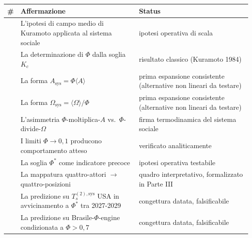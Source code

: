 {\def\LTcaptype{none} %
{\small\begin{longtable}[]{@{}
  >{\raggedright\arraybackslash}p{}
  >{\raggedright\arraybackslash}p{}
  >{\raggedright\arraybackslash}p{}@{}}
\toprule\noalign{}
\begin{minipage}[b]{\linewidth}\raggedright
\#
\end{minipage} & \begin{minipage}[b]{\linewidth}\raggedright
Affermazione
\end{minipage} & \begin{minipage}[b]{\linewidth}\raggedright
Status
\end{minipage} \\
\midrule\noalign{}
\endhead
\bottomrule\noalign{}
\endlastfoot
1 & L'ipotesi di campo medio di Kuramoto applicata al sistema sociale &
\Hypoth{} ipotesi operativa di scala \\
2 & La determinazione di \(\Phi\) dalla soglia \(K_c\) & \Proved{}
risultato classico (Kuramoto 1984) \\
3 & La forma \(A_{\text{sys}} = \Phi \langle A\rangle\) & \Hypoth{}
prima espansione consistente (alternative non lineari da testare) \\
4 & La forma \(\Omega_{\text{sys}} = \langle\Omega\rangle/\Phi\) &
\Hypoth{} prima espansione consistente (alternative non lineari da
testare) \\
5 & L'asimmetria \(\Phi\)-moltiplica-\(A\)
vs.~\(\Phi\)-divide-\(\Omega\) & \Hypoth{} firma termodinamica del
sistema sociale \\
6 & I limiti \(\Phi \to 0, 1\) producono comportamento atteso &
\Proved{} verificato analiticamente \\
7 & La soglia \(\Phi^*\) come indicatore precoce & \Hypoth{} ipotesi
operativa testabile \\
8 & La mappatura quattro-attori $\to$ quattro-posizioni & \Hypoth{} quadro
interpretativo, formalizzato in Parte III \\
9 & La predizione su \(T_s^{(2),\text{sys}}\) USA in avvicinamento a
\(\Phi^*\) tra 2027-2029 & \Conj{} congettura datata, falsificabile \\
10 & La predizione su Brasile-$\Phi$-engine condizionata a \(\Phi > 0{,}7\) &
\Conj{} congettura datata, falsificabile \\
\end{longtable}}
}


